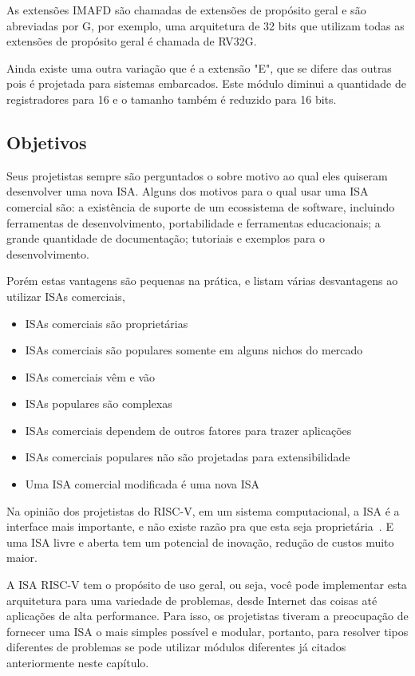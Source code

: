 	As extensões IMAFD são chamadas de extensões de propósito geral e são abreviadas por G, por exemplo, uma arquitetura de 32 bits que utilizam todas as extensões de propósito geral é chamada de RV32G.

	Ainda existe uma outra variação que é a extensão "E", que se difere das outras pois é projetada para sistemas embarcados. Este módulo diminui a quantidade de registradores para 16 e o tamanho também é reduzido para 16 bits.

	\subsection{Objetivos}

		Seus projetistas sempre são perguntados o sobre motivo ao qual eles quiseram desenvolver uma nova ISA. Alguns dos motivos para o qual usar uma ISA comercial são: a existência de suporte de um ecossistema de software, incluindo ferramentas de desenvolvimento, portabilidade e ferramentas educacionais; a grande quantidade de documentação; tutoriais e exemplos para o desenvolvimento.

		Porém estas vantagens são pequenas na prática, e listam várias desvantagens ao utilizar ISAs comerciais,

		\begin{itemize}
			\item ISAs comerciais são proprietárias
			\item ISAs comerciais são populares somente em alguns nichos do mercado
			\item ISAs comerciais vêm e vão
			\item ISAs populares são complexas
			\item ISAs comerciais dependem de outros fatores para trazer aplicações
			\item ISAs comerciais populares não são projetadas para extensibilidade
			\item Uma ISA comercial modificada é uma nova ISA
		\end{itemize}

		Na opinião dos projetistas do RISC-V, em um sistema computacional, a ISA é a interface mais importante, e não existe razão pra que esta seja proprietária~\cite{Waterman:EECS-2016-1}. E uma ISA livre e aberta tem um potencial de inovação, redução de custos muito maior. 

		A ISA RISC-V tem o propósito de uso geral, ou seja, você pode implementar esta arquitetura para uma variedade de problemas, desde Internet das coisas até aplicações de alta performance. Para isso, os projetistas tiveram a preocupação de fornecer uma ISA o mais simples possível e modular, portanto, para resolver tipos diferentes de problemas se pode utilizar módulos diferentes já citados anteriormente neste capítulo.

